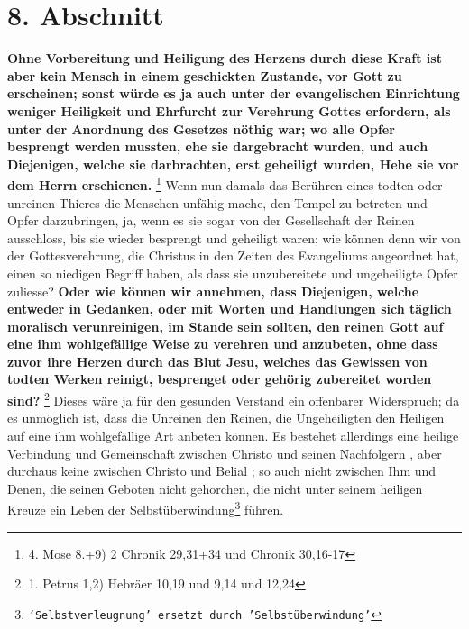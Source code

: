 \section{8. Abschnitt} \label{kap6_ab8}

\textbf{Ohne Vorbereitung und Heiligung des Herzens
durch diese Kraft ist aber kein
Mensch in einem geschickten Zustande, vor Gott zu erscheinen; sonst würde es ja
auch unter der evangelischen Einrichtung weniger Heiligkeit und Ehrfurcht zur
Verehrung Gottes erfordern, als unter der Anordnung des Gesetzes nöthig war; wo
alle Opfer besprengt werden mussten, ehe sie dargebracht wurden, und auch
Diejenigen, welche sie darbrachten, erst geheiligt wurden, Hehe sie vor dem
Herrn erschienen.}
\footnote{4. Mose 8.+9) 2 Chronik 29,31+34 und Chronik 30,16-17}
Wenn nun damals das Berühren eines todten oder unreinen Thieres die Menschen
unfähig mache, den Tempel zu betreten und Opfer darzubringen, ja, wenn es sie
sogar von der Gesellschaft der Reinen ausschloss, bis sie wieder besprengt und
geheiligt waren; wie können denn wir von der Gottesverehrung, die Christus in
den Zeiten des Evangeliums angeordnet hat, einen so niedigen Begriff haben, als
dass sie unzubereitete und ungeheiligte Opfer zuliesse? \textbf{Oder wie können
wir
annehmen, dass Diejenigen, welche entweder in Gedanken, oder mit Worten und
Handlungen sich täglich moralisch verunreinigen, im Stande sein sollten, den
reinen Gott auf eine ihm wohlgefällige Weise zu verehren und anzubeten, ohne
dass zuvor ihre Herzen durch das Blut Jesu, welches das Gewissen von todten
Werken  reinigt, besprenget oder gehörig zubereitet worden
sind?}
\footnote{1. Petrus 1,2)  Hebräer 10,19 und 9,14 und 12,24}
Dieses wäre ja für den gesunden Verstand ein
offenbarer Widerspruch; da es unmöglich ist, dass die Unreinen den Reinen, die
Ungeheiligten den Heiligen   auf eine ihm
wohlgefällige Art anbeten können. Es
bestehet allerdings eine heilige Verbindung und Gemeinschaft  zwischen Christo
und seinen Nachfolgern , aber durchaus keine zwischen Christo
und Belial ; so
auch nicht zwischen Ihm und Denen, die seinen Geboten nicht gehorchen, die nicht
unter seinem heiligen Kreuze ein Leben der
Selbstüberwindung\footnote{\texttt{'Selbstverleugnung' ersetzt durch
'Selbstüberwindung'}} führen.

